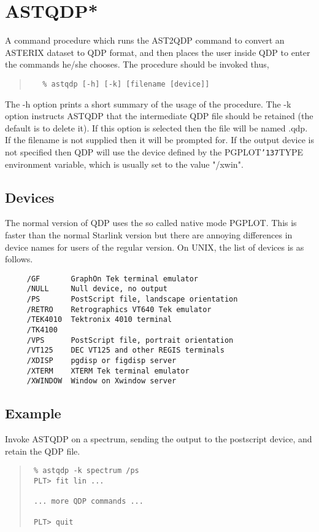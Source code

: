 \documentclass{book}
\renewcommand{\_}{{\tt\char'137}}     %
\begin{document}
\section{ASTQDP*}
A command procedure which runs the AST2QDP command to convert
an ASTERIX dataset to QDP format, and then places the user inside
QDP to enter the commands he/she chooses. The procedure should be
invoked thus,

\begin{quote}\begin{verbatim}
   % astqdp [-h] [-k] [filename [device]]
\end{verbatim}\end{quote}
The -h option prints a short summary of the usage of the procedure.
The -k option instructs ASTQDP that the intermediate QDP file
should be retained (the default is to delete it). If this option
is selected then the file will be named .qdp. If the
filename is not supplied then it will be prompted for. If the
output device is not specified then QDP will use the device defined
by the PGPLOT\_TYPE environment variable, which is usually set to
the value "/xwin".

\subsection{Devices}
The normal version of QDP uses the so called native mode PGPLOT.
This is faster than the normal Starlink version but there are
annoying differences in device names for users of the regular
version. On UNIX, the list of devices is as follows.
\begin{verbatim}
     /GF       GraphOn Tek terminal emulator
     /NULL     Null device, no output
     /PS       PostScript file, landscape orientation
     /RETRO    Retrographics VT640 Tek emulator
     /TEK4010  Tektronix 4010 terminal
     /TK4100
     /VPS      PostScript file, portrait orientation
     /VT125    DEC VT125 and other REGIS terminals
     /XDISP    pgdisp or figdisp server
     /XTERM    XTERM Tek terminal emulator
     /XWINDOW  Window on Xwindow server
\end{verbatim}
\subsection{Example}
Invoke ASTQDP on a spectrum, sending the output to the postscript
device, and retain the QDP file.

\begin{quote}\begin{verbatim}
 % astqdp -k spectrum /ps
 PLT> fit lin ...

 ... more QDP commands ...

 PLT> quit
\end{verbatim}\end{quote}
\end{document}

